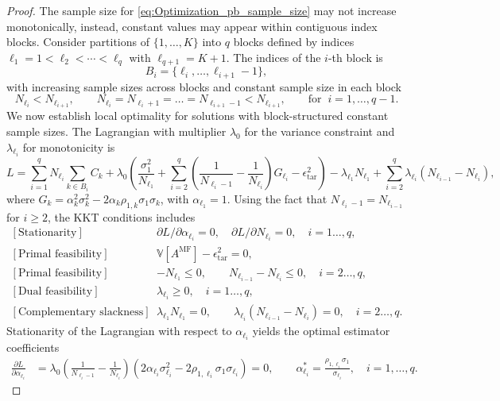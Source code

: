 \begin{proof}
The sample size for \eqref{eq:Optimization_pb_sample_size} may not increase monotonically, instead, constant values may appear within contiguous index blocks. Consider partitions of $\{1,\ldots,K\}$ into $q$ blocks defined by indices $\ell_1=1 < \ell_2 < \cdots < \ell_q$ with $\ell_{q+1} = K+1$. The indices of the $i$-th block is
%
\[
B_i = \{\ell_i, \ldots, \ell_{i+1}-1\},
\]
%
with increasing sample sizes across blocks and constant sample size in each block 
%
\[
N_{\ell_i} < N_{\ell_{i+1}},\quad\quad  N_{\ell_i}=N_{\ell_i+1}=\ldots = N_{\ell_{i+1}-1} <N_{\ell_{i+1}}, \qquad \text{for}\;\;  i=1,\ldots,q-1.
\]
%
We now establish local optimality for solutions with block-structured constant sample sizes.
The Lagrangian with multiplier $\lambda_0$ for the variance constraint and $\lambda_{\ell_i}$ for monotonicity is
%
\begin{equation*}
L= \sum_{i=1}^q N_{\ell_i}\sum_{k\in B_i} C_k +\lambda_0 \left(\frac{\sigma_1^2}{N_{\ell_1}} + \sum_{i=2}^q \left(\frac{1}{N_{\ell_i-1}} - \frac{1}{N_{\ell_i}}\right)G_{\ell_i}- \epsilon_{\text{tar}}^2\right)-\lambda_{\ell_1} N_{\ell_1}+\sum_{i=2}^q\lambda_{\ell_{i}}(N_{\ell_{i-1}} - N_{\ell_{i}}),
\end{equation*}
%
where $G_k = \alpha_k^2\sigma_k^2 - 2\alpha_k\rho_{1,k}\sigma_1\sigma_k$, with $\alpha_{\ell_1} = 1$.
Using the fact that $N_{\ell_{i}-1} = N_{\ell_{i-1}}$ for $i\ge 2$, the KKT conditions includes
%
\[
\begin{array}{ll}
\left[\text{Stationarity}\right]&\partial L/\partial \alpha_{\ell_i}=0,\quad \partial L/{\partial N_{\ell_i}}=0,\quad i=1\ldots,q,\\
\left[\text{Primal feasibility}\right]&\mathbb{V}\left[A^{\text{MF}}\right]- \epsilon_{\text{tar}}^2 = 0, \\ 
\left[\text{Primal feasibility}\right] &-N_{\ell_1}\le 0,\qquad N_{\ell_{i-1}}-N_{\ell_i} \le 0, \quad i=2\ldots,q,\\ 
\left[\text{Dual feasibility}\right]  &\lambda_{\ell_i} \ge 0,\quad i=1\ldots,q, \\ 
\left[\text{Complementary slackness}\right]  &\lambda_{\ell_1} N_{\ell_1}=0,\qquad\lambda_{\ell_i}(N_{\ell_{i-1}}-N_{\ell_i})=0,\quad i=2\ldots,q.
\end{array}
\]
%
Stationarity of the Lagrangian with respect to $\alpha_{\ell_i}$ yields the optimal estimator coefficients
%
\begin{align}
\label{eq:partial_L_alpha_k}
    \frac{\partial L}{\partial \alpha_{\ell_i}}&=\lambda_0\left(\frac{1}{N_{\ell_i-1}} - \frac{1}{N_{\ell_i}}\right)\left(2\alpha_{\ell_i}\sigma_{\ell_i}^2 - 2\rho_{1,\ell_i}\sigma_1\sigma_{\ell_i}\right)=0,\quad\quad  \alpha_{\ell_i}^* = \frac{\rho_{1,\ell_i}\sigma_1}{\sigma_{\ell_i}}, \quad i=1,\dots,q.

\end{align}
\end{proof}
